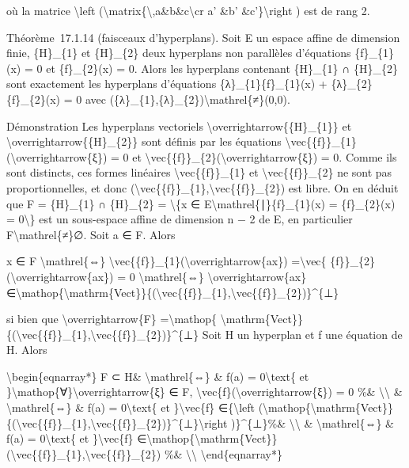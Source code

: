 \documentclass[]{article}
\begin{document}
où la matrice \textbackslash{}left
(\textbackslash{}matrix\{\textbackslash{},a\&b\&c\textbackslash{}cr a'
\&b' \&c'\}\textbackslash{}right ) est de rang 2.

Théorème~17.1.14 (faisceaux d'hyperplans). Soit E un espace affine de
dimension finie, \{H\}\_\{1\} et \{H\}\_\{2\} deux hyperplans non
parallèles d'équations \{f\}\_\{1\}(x) = 0 et \{f\}\_\{2\}(x) = 0. Alors
les hyperplans contenant \{H\}\_\{1\} ∩ \{H\}\_\{2\} sont exactement les
hyperplans d'équations \{λ\}\_\{1\}\{f\}\_\{1\}(x) +
\{λ\}\_\{2\}\{f\}\_\{2\}(x) = 0 avec
(\{λ\}\_\{1\},\{λ\}\_\{2\})\textbackslash{}mathrel\{≠\}(0,0).

Démonstration Les hyperplans vectoriels
\textbackslash{}overrightarrow\{\{H\}\_\{1\}\} et
\textbackslash{}overrightarrow\{\{H\}\_\{2\}\} sont définis par les
équations
\textbackslash{}vec\{\{f\}\}\_\{1\}(\textbackslash{}overrightarrow\{ξ\})
= 0 et
\textbackslash{}vec\{\{f\}\}\_\{2\}(\textbackslash{}overrightarrow\{ξ\})
= 0. Comme ils sont distincts, ces formes linéaires
\textbackslash{}vec\{\{f\}\}\_\{1\} et
\textbackslash{}vec\{\{f\}\}\_\{2\} ne sont pas proportionnelles, et
donc
(\textbackslash{}vec\{\{f\}\}\_\{1\},\textbackslash{}vec\{\{f\}\}\_\{2\})
est libre. On en déduit que F = \{H\}\_\{1\} ∩ \{H\}\_\{2\} =
\textbackslash{}\{x ∈ E\textbackslash{}mathrel\{∣\}\{f\}\_\{1\}(x) =
\{f\}\_\{2\}(x) = 0\textbackslash{}\} est un sous-espace affine de
dimension n − 2 de E, en particulier F\textbackslash{}mathrel\{≠\}∅.
Soit a ∈ F. Alors

x ∈ F \textbackslash{}mathrel\{⇔\}
\textbackslash{}vec\{\{f\}\}\_\{1\}(\textbackslash{}overrightarrow\{ax\})
=\textbackslash{}vec\{
\{f\}\}\_\{2\}(\textbackslash{}overrightarrow\{ax\}) = 0
\textbackslash{}mathrel\{⇔\} \textbackslash{}overrightarrow\{ax\}
∈\textbackslash{}mathop\{\textbackslash{}mathrm\{Vect\}\}\{(\textbackslash{}vec\{\{f\}\}\_\{1\},\textbackslash{}vec\{\{f\}\}\_\{2\})\}\^{}\{⊥\}

si bien que \textbackslash{}overrightarrow\{F\}
=\textbackslash{}mathop\{
\textbackslash{}mathrm\{Vect\}\}\{(\textbackslash{}vec\{\{f\}\}\_\{1\},\textbackslash{}vec\{\{f\}\}\_\{2\})\}\^{}\{⊥\}
Soit H un hyperplan et f une équation de H. Alors

\textbackslash{}begin\{eqnarray*\} F ⊂ H\& \textbackslash{}mathrel\{⇔\}
\& f(a) = 0\textbackslash{}text\{ et
\}\textbackslash{}mathop\{∀\}\textbackslash{}overrightarrow\{ξ\} ∈ F,
\textbackslash{}vec\{f\}(\textbackslash{}overrightarrow\{ξ\}) = 0 \%\&
\textbackslash{}\textbackslash{} \& \textbackslash{}mathrel\{⇔\} \& f(a)
= 0\textbackslash{}text\{ et \}\textbackslash{}vec\{f\}
∈\{\textbackslash{}left
(\textbackslash{}mathop\{\textbackslash{}mathrm\{Vect\}\}\{(\textbackslash{}vec\{\{f\}\}\_\{1\},\textbackslash{}vec\{\{f\}\}\_\{2\})\}\^{}\{⊥\}\textbackslash{}right
)\}\^{}\{⊥\}\%\& \textbackslash{}\textbackslash{} \&
\textbackslash{}mathrel\{⇔\} \& f(a) = 0\textbackslash{}text\{ et
\}\textbackslash{}vec\{f\}
∈\textbackslash{}mathop\{\textbackslash{}mathrm\{Vect\}\}(\textbackslash{}vec\{\{f\}\}\_\{1\},\textbackslash{}vec\{\{f\}\}\_\{2\})
\%\& \textbackslash{}\textbackslash{} \textbackslash{}end\{eqnarray*\}
\end{document}
